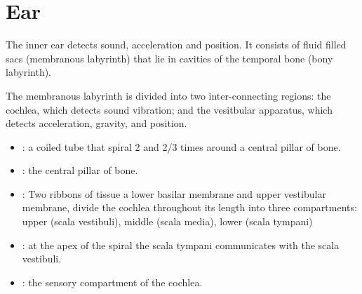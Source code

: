 \newpage
\section{Ear}
The inner ear detects sound, acceleration and position. It consists of fluid filled sacs (membranous labyrinth) that lie in cavities of the temporal bone (bony labyrinth).

The membranous labyrinth is divided into two inter-connecting regions: the cochlea, which detects sound vibration; and the vesitbular apparatus, which detects acceleration, gravity, and position.
\begin{center}
\end{center}
\newpage
\begin{multicols}{2}
\begin{itemize}
  \item {}: a coiled tube that spiral 2 and 2/3 times around a central pillar of bone.
  
  \begin{center}
  \end{center}
  
  \item {}: the central pillar of bone.
  
  \begin{center}
  \end{center}
  
  \item {}: Two ribbons of tissue a lower basilar membrane and upper vestibular membrane, divide the cochlea throughout its length into three compartments: upper (scala vestibuli), middle (scala media), lower (scala tympani)
  
  \begin{center}
  \end{center}
  
  \item {}: at the apex of the spiral the scala tympani communicates with the scala vestibuli.
  
  \begin{center}
  \end{center}
  
  \item {}: the sensory compartment of the cochlea.
  

\end{itemize}
\end{multicols}
